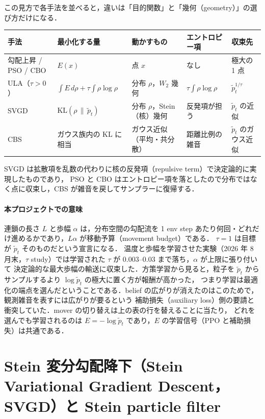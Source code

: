 \documentclass[a4paper,11pt]{article}
\newcommand{\ptil}{\tilde p_t}
\begin{document}
この見方で各手法を並べると，違いは「目的関数」と「幾何（geometry）」の選び方だけになる．

\begin{center}
\footnotesize
\begin{tabular}{p{36mm}p{30mm}p{30mm}p{19mm}p{22mm}}
\toprule
手法 & 最小化する量 & 動かすもの & エントロピー項 & 収束先 \\
\midrule
勾配上昇 / PSO / CBO & $E(x)$ & 点 $x$ & なし & 極大の 1 点 \\
ULA（$\tau > 0$） & $\int E\,d\rho + \tau \int \rho \log \rho$ & 分布 $\rho$，$W_2$ 幾何 & $\tau \int \rho \log \rho$ & $\ptil^{1/\tau}$ \\
SVGD & $\mathrm{KL}(\rho \,\|\, \ptil)$ & 分布 $\rho$，Stein（核）幾何 & 反発項が担う & $\ptil$ の近似 \\
CBS & ガウス族内の KL に相当 & ガウス近似（平均・共分散） & 距離比例の雑音 & $\ptil$ のガウス近似 \\
\bottomrule
\end{tabular}
\end{center}

SVGD は拡散項を乱数の代わりに核の反発項（repulsive term）で決定論的に実現したものであり，
PSO と CBO はエントロピー項を落としたので分布ではなく点に収束し，CBS が雑音を戻してサンプラーに復帰する．

\paragraph{本プロジェクトでの意味}
連鎖の長さ $L$ と歩幅 $\alpha$ は，分布空間の勾配流を 1 env step あたり何回・どれだけ進めるかであり，$L\alpha$ が移動予算（movement budget）である．
$\tau = 1$ は目標が $\ptil$ そのものだという宣言になる．
温度と歩幅を学習させた実験（2026 年 8 月末，$\tau$ study）では学習された $\tau$ が $0.003$--$0.03$ まで落ち，$\alpha$ が上限に張り付いて
決定論的な最大歩幅の輸送に収束した．方策学習から見ると，粒子を $\ptil$ からサンプルするより $\log \ptil$ の極大に置く方が報酬が高かった，
つまり学習は最適化の端点を選んだということである．belief の広がりが消えたのはこのためで，観測雑音を表すには広がりが要るという
補助損失（auxiliary loss）側の要請と衝突していた．mover の切り替えは上の表の行を替えることに当たり，
どれを選んでも学習されるのは $E = -\log \ptil$ であり，$E$ の学習信号（PPO と補助損失）は共通である．

\section{Stein 変分勾配降下（Stein Variational Gradient Descent，SVGD）と Stein particle filter}
\end{document}
